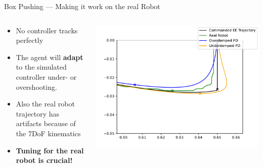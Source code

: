 \documentclass[16:9,en,navbarinfooter]{sdqbeamer}
\begin{document}
\begin{frame}{Box Pushing --- Making it work on the real Robot}
\begin{columns}
    \begin{column}{0.5\textwidth}
        \begin{itemize}
                \item No controller tracks perfectly
                \item The agent will \textbf{adapt} to the simulated controller under- or overshooting.
                \item Also the real robot trajectory has artifacts because of the 7DoF kinematics
                \item \textbf{Tuning for the real robot is crucial!}
        \end{itemize}
    \end{column}
    \begin{column}{0.5\textwidth}
\includegraphics[width=\linewidth]{media/traj_error.pdf}
    \end{column}
\end{columns}

\end{frame}
\end{document}
